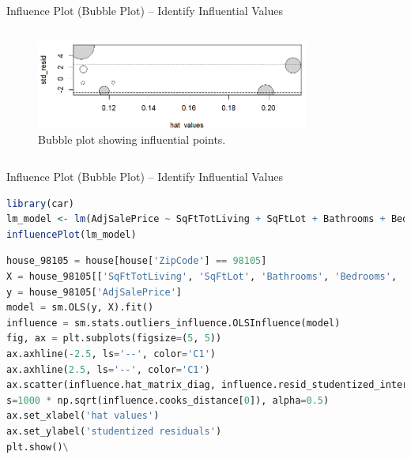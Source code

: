 \documentclass{beamer}
\begin{document}
	
	\begin{frame}[fragile]{Influence Plot (Bubble Plot) – Identify Influential Values}
		\begin{columns}
		
			\begin{figure}
				\includegraphics[width=0.8\textwidth]{influence_plot.png}
				\caption{Bubble plot showing influential points.}
			\end{figure}
		\end{columns}
	\end{frame}
	
	\begin{frame}[fragile]{Influence Plot (Bubble Plot) – Identify Influential Values}
		\begin{itemize}
		\end{itemize}

				\begin{lstlisting}[language=R, caption=Influence Plot in R]
library(car)
lm_model <- lm(AdjSalePrice ~ SqFtTotLiving + SqFtLot + Bathrooms + Bedrooms + BldgGrade, data=house_98105)
influencePlot(lm_model)
		\end{lstlisting}
		\begin{lstlisting}[language=Python, caption=Influence Plot in Python]
house_98105 = house[house['ZipCode'] == 98105]
X = house_98105[['SqFtTotLiving', 'SqFtLot', 'Bathrooms', 'Bedrooms', 'BldgGrade']].assign(const=1)
y = house_98105['AdjSalePrice']
model = sm.OLS(y, X).fit()
influence = sm.stats.outliers_influence.OLSInfluence(model)
fig, ax = plt.subplots(figsize=(5, 5))
ax.axhline(-2.5, ls='--', color='C1')
ax.axhline(2.5, ls='--', color='C1')
ax.scatter(influence.hat_matrix_diag, influence.resid_studentized_internal,
s=1000 * np.sqrt(influence.cooks_distance[0]), alpha=0.5)
ax.set_xlabel('hat values')
ax.set_ylabel('studentized residuals')
plt.show()\
		\end{lstlisting}
	\end{frame}
	
\end{document}
